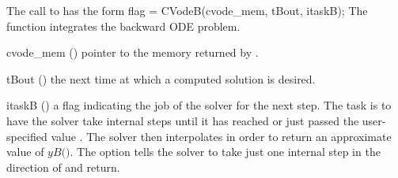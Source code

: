 The call to  has the form
{
  flag = CVodeB(cvode\_mem, tBout, itaskB);
}
{
  The function  integrates the backward ODE problem.
}
{
  \begin{args}
  \item[cvode\_mem] ()
    pointer to the {\cvodes} memory returned by .
  \item[tBout] ()
    the next time at which a computed solution is desired.
  \item[itaskB] ()
    a flag indicating the job of the solver for the next step.
    The  task is to have the solver take internal steps until
    it has reached or just passed the user-specified value .
    The solver then interpolates in order to
    return an approximate value of $yB($$)$.
    The  option tells the solver to take just one internal step in
    the direction of  and return.
  \end{args}
}
